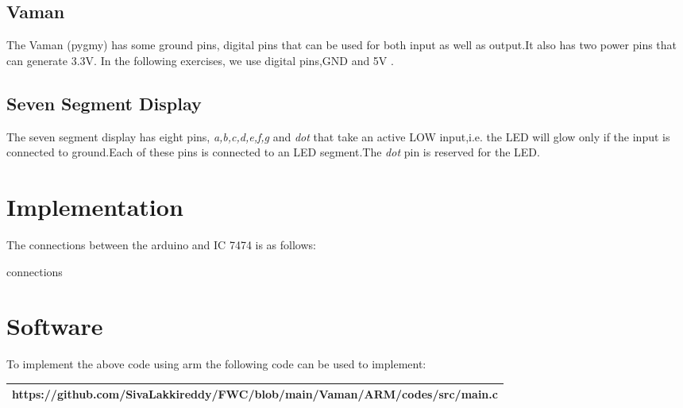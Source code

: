 \documentclass[10pt,a4paper]{article}
\begin{document}
\subsection{Vaman} 
The Vaman (pygmy) has some ground pins, digital pins that can be used for both input as well as output.It also has two power pins that can generate 3.3V. In the following exercises, we use digital pins,GND and 5V .
\subsection{Seven Segment Display}
The seven segment display has eight pins, \emph{a,b,c,d,e,f,g} and \emph{dot} that take an active LOW input,i.e. the LED will glow only if the input is connected to ground.Each of these pins is connected to an LED segment.The \emph{dot} pin is reserved for the LED.
\section{Implementation}
The connections between the arduino and IC 7474 is as follows:
   \begin{table}[h]
	   \begin{center}
		   
		   \caption{connections}
		   \label{table:3}
	   \end{center}
   \end{table}  
         
\section{Software}
To implement the above code using arm the following code can be used to implement:

   \begin{tabularx}{1\textwidth} { 
  | >{\centering\arraybackslash}X |}
  \hline
  https://github.com/SivaLakkireddy/FWC/blob/main/Vaman/ARM/codes/src/main.c\\
  \hline
\end{tabularx}



\end{document}
